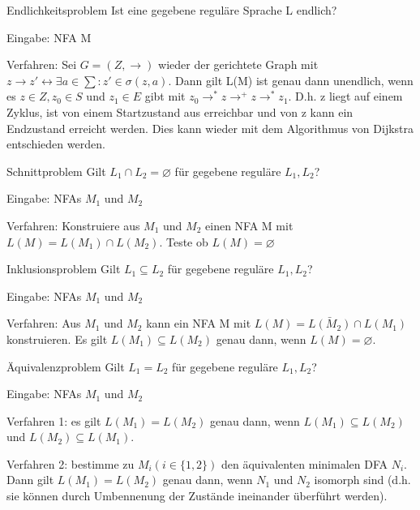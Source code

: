\documentclass[avery5371, frame]{flashcards}
\begin{document}
\begin{flashcard}{Endlichkeitsproblem}
    Ist eine gegebene reguläre Sprache L endlich?

    Eingabe: NFA M

    Verfahren: Sei $G=(Z,\rightarrow)$ wieder der gerichtete Graph mit $z\rightarrow z' \leftrightarrow \exists a \in\sum:z'\in\sigma(z,a)$. Dann gilt L(M) ist genau dann unendlich, wenn es $z\in Z,z_0\in S$ und $z_1\in E$ gibt mit $z_0\rightarrow^* z \rightarrow^+ z \rightarrow^* z_1$. D.h. z liegt auf einem Zyklus, ist von einem Startzustand aus erreichbar und von z kann ein Endzustand erreicht werden. Dies kann wieder mit dem Algorithmus von Dijkstra entschieden werden.
\end{flashcard}

\begin{flashcard}{Schnittproblem}
    Gilt $L_1\cap L_2=\varnothing$ für gegebene reguläre $L_1,L_2$?

    Eingabe: NFAs $M_1$ und $M_2$

    Verfahren: Konstruiere aus $M_1$ und $M_2$ einen NFA M mit $L(M)=L(M_1)\cap L(M_2)$. Teste ob $L(M)=\varnothing$
\end{flashcard}

\begin{flashcard}{Inklusionsproblem}
    Gilt $L_1 \subseteq L_2$ für gegebene reguläre $L_1,L_2$?

    Eingabe: NFAs $M_1$ und $M_2$

    Verfahren: Aus $M_1$ und $M_2$ kann ein NFA M mit $L(M)=\bar{L(M_2)}\cap L(M_1)$ konstruieren. Es gilt $L(M_1)\subseteq L(M_2)$ genau dann, wenn $L(M)=\varnothing$.
\end{flashcard}

\begin{flashcard}{Äquivalenzproblem}
    Gilt $L_1=L_2$ für gegebene reguläre $L_1,L_2$?

    Eingabe: NFAs $M_1$ und $M_2$

    Verfahren 1: es gilt $L(M_1)=L(M_2)$ genau dann, wenn $L(M_1)\subseteq L(M_2)$ und $L(M_2)\subseteq L(M_1)$.

    Verfahren 2: bestimme zu $M_i (i\in\{1,2\})$ den äquivalenten minimalen DFA $N_i$. Dann gilt $L(M_1)=L(M_2)$ genau dann, wenn $N_1$ und $N_2$ isomorph sind (d.h. sie können durch Umbennenung der Zustände ineinander überführt werden).
\end{flashcard}
\end{document}
